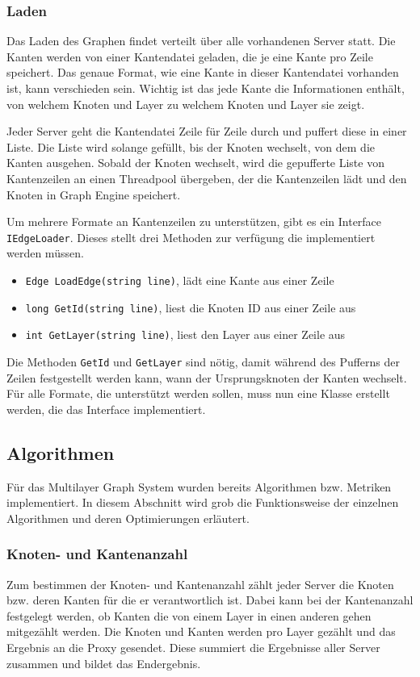 \subsubsection{Laden}

Das Laden des Graphen findet verteilt über alle vorhandenen Server statt. Die Kanten werden von einer Kantendatei geladen, die je eine Kante pro Zeile speichert. Das genaue Format, wie eine Kante in dieser Kantendatei vorhanden ist, kann verschieden sein. Wichtig ist das jede Kante die Informationen enthält, von welchem Knoten und Layer zu welchem Knoten und Layer sie zeigt.

Jeder Server geht die Kantendatei Zeile für Zeile durch und puffert diese in einer Liste. Die Liste wird solange gefüllt, bis der Knoten wechselt, von dem die Kanten ausgehen. Sobald der Knoten wechselt, wird die gepufferte Liste von Kantenzeilen an einen Threadpool übergeben, der die Kantenzeilen lädt und den Knoten in Graph Engine speichert.

Um mehrere Formate an Kantenzeilen zu unterstützen, gibt es ein Interface \verb|IEdgeLoader|. Dieses stellt drei Methoden zur verfügung die implementiert werden müssen.

\begin{itemize}
  \item \verb|Edge LoadEdge(string line)|, lädt eine Kante aus einer Zeile
  \item \verb|long GetId(string line)|, liest die Knoten ID aus einer Zeile aus
  \item \verb|int GetLayer(string line)|, liest den Layer aus einer Zeile aus
\end{itemize}

Die Methoden \verb|GetId| und \verb|GetLayer| sind nötig, damit während des Pufferns der Zeilen festgestellt werden kann, wann der Ursprungsknoten der Kanten wechselt.
Für alle Formate, die unterstützt werden sollen, muss nun eine Klasse erstellt werden, die das Interface implementiert.


\subsection{Algorithmen}

Für das Multilayer Graph System wurden bereits Algorithmen bzw. Metriken implementiert. In diesem Abschnitt wird grob die Funktionsweise der einzelnen Algorithmen und deren Optimierungen erläutert.


\subsubsection{Knoten- und Kantenanzahl}
Zum bestimmen der Knoten- und Kantenanzahl zählt jeder Server die Knoten bzw. deren Kanten für die er verantwortlich ist. Dabei kann bei der Kantenanzahl festgelegt werden, ob Kanten die von einem Layer in einen anderen gehen mitgezählt werden.
Die Knoten und Kanten werden pro Layer gezählt und das Ergebnis an die Proxy gesendet. Diese summiert die Ergebnisse aller Server zusammen und bildet das Endergebnis.
 

